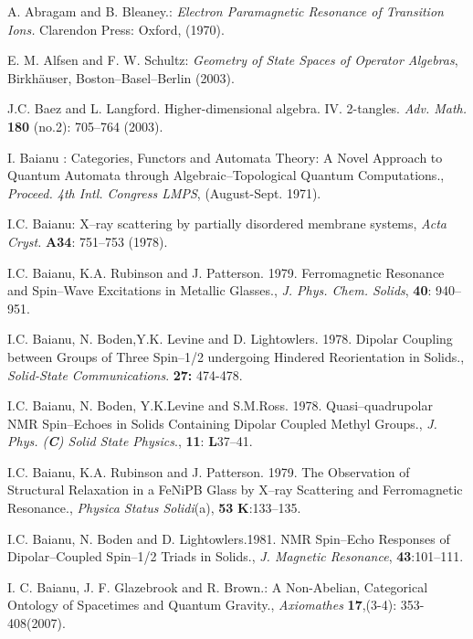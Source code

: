 \documentclass[12pt]{article}
\theoremstyle{plain}
\theoremstyle{definition}
\numberwithin{equation}{section}
\newcommand{\<}{{\langle}}
\begin{document}
\begin{thebibliography}{99}

A. Abragam and B. Bleaney.: {\em Electron Paramagnetic Resonance of Transition Ions.}
Clarendon Press: Oxford, (1970).

E. M. Alfsen and F. W. Schultz: \emph{Geometry of State Spaces of Operator Algebras}, 
Birkh\"auser, Boston--Basel--Berlin (2003).

J.C. Baez and L. Langford. Higher-dimensional algebra. IV. 2-tangles. \textit{Adv. Math.}
\textbf{180} (no.2): 705--764 (2003).

I. Baianu : Categories, Functors and Automata Theory: A Novel Approach to Quantum Automata through Algebraic--Topological Quantum Computations., \textit{Proceed. 4th Intl. Congress LMPS}, (August-Sept. 1971).

I.C. Baianu: X--ray scattering by partially disordered membrane systems,
 \emph{Acta Cryst.} \textbf{A34}: 751--753 (1978).

I.C. Baianu, K.A. Rubinson and  J. Patterson. 1979.  Ferromagnetic Resonance and Spin--Wave 
Excitations in Metallic Glasses., \emph{J. Phys. Chem. Solids}, \textbf{40}: 940--951.

I.C. Baianu, N. Boden,Y.K. Levine and D. Lightowlers. 1978. Dipolar Coupling between Groups of Three Spin--1/2 undergoing Hindered Reorientation in Solids., \emph{Solid-State Communications}. \textbf{27:} 474-478.

I.C. Baianu, N. Boden, Y.K.Levine and S.M.Ross. 1978. Quasi--quadrupolar NMR Spin--Echoes in
Solids Containing Dipolar Coupled Methyl Groups.,  \emph{J. Phys. (\textbf{C}) Solid State
Physics}., \textbf{11}: \textbf{L}37--41.

I.C. Baianu, K.A. Rubinson and J. Patterson. 1979. The Observation of Structural Relaxation in a FeNiPB Glass by X--ray Scattering and Ferromagnetic Resonance., \emph{Physica Status Solidi}(a), \textbf{53} \textbf{K}:133--135.

I.C. Baianu, N. Boden and D. Lightowlers.1981. NMR Spin--Echo Responses of Dipolar--Coupled
Spin--1/2 Triads in Solids., \emph{J. Magnetic Resonance}, \textbf{43}:101--111.

I. C. Baianu, J. F. Glazebrook and R. Brown.: A Non-Abelian, Categorical Ontology of Spacetimes and Quantum Gravity., \emph{Axiomathes} \textbf{17},(3-4): 353-408(2007).


\end{thebibliography}
\end{document}
